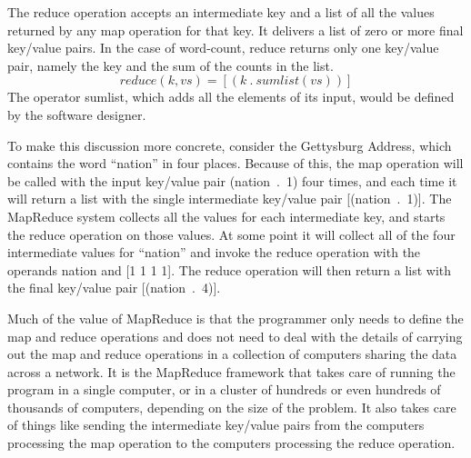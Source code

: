 The reduce operation accepts an intermediate key and a list of
all the values returned by any map operation for that key.
It delivers a list of zero or more final key/value pairs.
In the case of word-count, reduce returns only one key/value pair,
namely the key and the sum of the counts in the list.
\begin{displaymath}
reduce(k, vs) = [ ( k ~.~ sumlist(vs) ) ]
\end{displaymath}
The operator sumlist, which adds all the elements of its
input, would be defined by the software designer.

To make this discussion more concrete, consider the Gettysburg Address,
which contains the word ``nation'' in four places. Because of this,
the map operation will be called with the input key/value pair \textsf{(nation~.~1)}
four times, and each time it will return a list with
the single intermediate key/value pair \textsf{[(nation~.~1)]}. The MapReduce
system collects all the values for each intermediate key, and starts the reduce
operation on those values.
At some point it will collect all of the four intermediate
values for ``nation'' and invoke the reduce operation with the operands
\textsf{nation} and \textsf{[1 1 1 1]}.
The reduce operation will then
return a list with the final key/value pair \textsf{[(nation~.~4)]}.


Much of the value of MapReduce is that the programmer only needs to
define the map and reduce operations and
does not need to deal with the details of carrying out the map and reduce
operations in a collection of computers sharing the data across a
network.  It is the MapReduce
framework that takes care of running the program in a single
computer, or in a cluster of hundreds or even hundreds of thousands
of computers, depending on the size of the problem.
It also takes care of things like
sending the intermediate key/value pairs
from the computers processing the map operation to the computers
processing the reduce operation.


